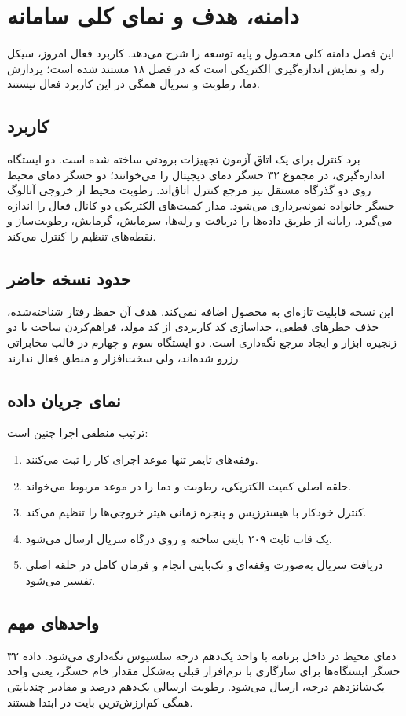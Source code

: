 \chapter{دامنه، هدف و نمای کلی سامانه}

این فصل دامنه کلی محصول و پایه توسعه را شرح می‌دهد. کاربرد فعال امروز، سیکل رله و نمایش اندازه‌گیری الکتریکی است که در فصل ۱۸ مستند شده است؛ پردازش دما، رطوبت و سریال همگی در این کاربرد فعال نیستند.

\section{کاربرد}
برد کنترل برای یک اتاق آزمون تجهیزات برودتی ساخته شده است. دو ایستگاه اندازه‌گیری، در مجموع ۳۲ حسگر دمای دیجیتال را می‌خوانند؛ دو حسگر دمای محیط روی دو گذرگاه مستقل نیز مرجع کنترل اتاق‌اند. رطوبت محیط از خروجی آنالوگ حسگر خانواده
نمونه‌برداری می‌شود. مدار
کمیت‌های الکتریکی دو کانال فعال را اندازه می‌گیرد. رایانه از طریق
داده‌ها را دریافت و رله‌ها، سرمایش، گرمایش، رطوبت‌ساز و نقطه‌های تنظیم را کنترل می‌کند.

\section{حدود نسخه حاضر}
این نسخه قابلیت تازه‌ای به محصول اضافه نمی‌کند. هدف آن حفظ رفتار شناخته‌شده، حذف خطرهای قطعی، جداسازی کد کاربردی از کد مولد، فراهم‌کردن ساخت با دو زنجیره ابزار و ایجاد مرجع نگه‌داری است. دو ایستگاه سوم و چهارم در قالب مخابراتی رزرو شده‌اند، ولی سخت‌افزار و منطق فعال ندارند.

\section{نمای جریان داده}
ترتیب منطقی اجرا چنین است:

\begin{enumerate}
  \item وقفه‌های تایمر تنها موعد اجرای کار را ثبت می‌کنند.
  \item حلقه اصلی کمیت الکتریکی، رطوبت و دما را در موعد مربوط می‌خواند.
  \item کنترل خودکار با هیسترزیس و پنجره زمانی هیتر خروجی‌ها را تنظیم می‌کند.
  \item یک قاب ثابت ۲۰۹ بایتی ساخته و روی درگاه سریال ارسال می‌شود.
  \item دریافت سریال به‌صورت وقفه‌ای و تک‌بایتی انجام و فرمان کامل در حلقه اصلی تفسیر می‌شود.
\end{enumerate}

\section{واحدهای مهم}
دمای محیط در داخل برنامه با واحد یک‌دهم درجه سلسیوس نگه‌داری می‌شود. داده ۳۲ حسگر ایستگاه‌ها برای سازگاری با نرم‌افزار قبلی به‌شکل مقدار خام حسگر، یعنی واحد یک‌شانزدهم درجه، ارسال می‌شود. رطوبت ارسالی یک‌دهم درصد و مقادیر چندبایتی همگی کم‌ارزش‌ترین بایت در ابتدا هستند.

